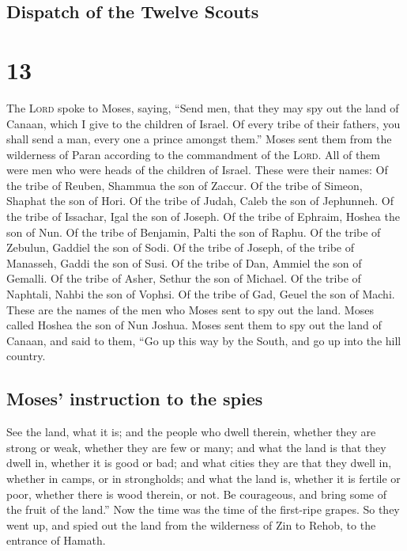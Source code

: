 \hypertarget{dispatch-of-the-twelve-scouts}{%
\subsection{Dispatch of the Twelve
Scouts}\label{dispatch-of-the-twelve-scouts}}

\hypertarget{section-12}{%
\section{13}\label{section-12}}

 The \textsc{Lord} spoke to Moses, saying, 
``Send men, that they may spy out the land of Canaan, which I give to
the children of Israel. Of every tribe of their fathers, you shall send
a man, every one a prince amongst them.''  Moses sent them
from the wilderness of Paran according to the commandment of the
\textsc{Lord}. All of them were men who were heads of the children of
Israel.  These were their names: Of the tribe of Reuben,
Shammua the son of Zaccur.  Of the tribe of Simeon,
Shaphat the son of Hori.  Of the tribe of Judah, Caleb the
son of Jephunneh.  Of the tribe of Issachar, Igal the son
of Joseph.  Of the tribe of Ephraim, Hoshea the son of
Nun.  Of the tribe of Benjamin, Palti the son of Raphu.
 Of the tribe of Zebulun, Gaddiel the son of Sodi.
 Of the tribe of Joseph, of the tribe of Manasseh, Gaddi
the son of Susi.  Of the tribe of Dan, Ammiel the son of
Gemalli.  Of the tribe of Asher, Sethur the son of
Michael.  Of the tribe of Naphtali, Nahbi the son of
Vophsi.  Of the tribe of Gad, Geuel the son of Machi.
 These are the names of the men who Moses sent to spy out
the land. Moses called Hoshea the son of Nun Joshua. 
Moses sent them to spy out the land of Canaan, and said to them, ``Go up
this way by the South, and go up into the hill country.

\hypertarget{moses-instruction-to-the-spies}{%
\subsection{Moses' instruction to the
spies}\label{moses-instruction-to-the-spies}}

 See the land, what it is; and the people who dwell
therein, whether they are strong or weak, whether they are few or many;
 and what the land is that they dwell in, whether it is
good or bad; and what cities they are that they dwell in, whether in
camps, or in strongholds;  and what the land is, whether
it is fertile or poor, whether there is wood therein, or not. Be
courageous, and bring some of the fruit of the land.'' Now the time was
the time of the first-ripe grapes.  So they went up, and
spied out the land from the wilderness of Zin to Rehob, to the entrance
of Hamath.

